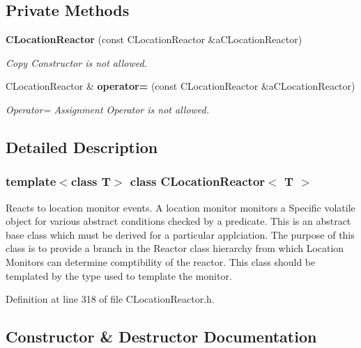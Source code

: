 \subsection*{Private Methods}
\begin{CompactItemize}
\item 
{\bf CLocation\-Reactor} (const CLocation\-Reactor \&a\-CLocation\-Reactor)
\begin{CompactList}\small\item\em Copy Constructor is not allowed.\item\end{CompactList}\item 
CLocation\-Reactor \& {\bf operator=} (const CLocation\-Reactor \&a\-CLocation\-Reactor)
\begin{CompactList}\small\item\em Operator= Assignment Operator is not allowed.\item\end{CompactList}\end{CompactItemize}


\subsection{Detailed Description}
\subsubsection*{template$<$class T$>$ class CLocation\-Reactor$<$ T $>$}

Reacts to location monitor events. A location monitor monitors a Specific volatile object for various abstract conditions checked by a predicate. This is an abstract base class which must be derived for a particular applciation. The purpose of this class is to provide a branch in the Reactor class hierarchy from which Location Monitors can determine comptibility of the reactor. This class should be templated by the type used to template the monitor. 



Definition at line 318 of file CLocation\-Reactor.h.

\subsection{Constructor \& Destructor Documentation}
